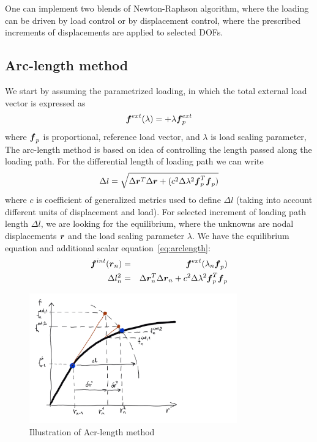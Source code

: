 One can implement two blends of Newton-Raphson algorithm, where the loading can be driven by load control or by displacement control, where the prescribed increments of displacements are applied to selected DOFs.

\subsection{Arc-length method}
We start by assuming the parametrized loading, in which the total external load vector is expressed as 
$$\mbox{\boldmath$f$}^{ext}(\lambda) = +\lambda\mbox{\boldmath$f$}^{ext}_p$$
where $\mbox{\boldmath$f$}_p$ is proportional, reference load vector, and $\lambda$ is load scaling parameter, 
The arc-length method is based on idea of controlling the length passed along the loading path. For the differential length of loading  path we can write
\begin{equation}
  \Delta l = \sqrt{\Delta\mbox{\boldmath$r$}^T\Delta\mbox{\boldmath$r$}+(c^2\Delta\lambda^2\mbox{\boldmath$f$}^T_p\mbox{\boldmath$f$}_p)}
  \label{eq:arclength}
\end{equation}
where $c$ is coefficient of generalized metrics used to define $\Delta l$ (taking into account different units of displacement and load).
For selected increment of loading path length $\Delta l$, we are looking for the equilibrium, where the unknowns are nodal displacements $\mbox{\boldmath$r$}$ and the load scaling parameter $\lambda$. We have the equilibrium equation and additional scalar equation~\ref{eq:arclength}:
\begin{eqnarray}
  \label{eq:alm1}
  \mbox{\boldmath$f$}^{int}(\mbox{\boldmath$r$}_n) &=& \mbox{\boldmath$f$}^{ext}(\lambda_n\mbox{\boldmath$f$}_p)\\
  \label{eq:alm2}
  \Delta l_n^2&=&\Delta\mbox{\boldmath$r$}_n^T\Delta\mbox{\boldmath$r$}_n+c^2\Delta\lambda^2\mbox{\boldmath$f$}^T_p\mbox{\boldmath$f$}_p
\end{eqnarray}

\begin{figure}
  \begin{center}
    \includegraphics[width=0.8\textwidth]{figs/arclength.png}
  \end{center}
  \label{fig:arclength}
  \caption{Illustration of Acr-length method}
\end{figure}


